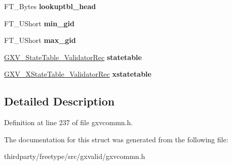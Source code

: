 \begin{DoxyCompactItemize}
\mbox{\label{struct_g_x_v___validator_rec___a6c6e818fa3ad9f2e4bad5c5f7ebfc156}} 
F\+T\+\_\+\+Bytes {\bfseries lookuptbl\+\_\+head}
\item 
\mbox{\label{struct_g_x_v___validator_rec___a9ceebe8532a8e4fc16194a38cb6a0fc1}} 
F\+T\+\_\+\+U\+Short {\bfseries min\+\_\+gid}
\item 
\mbox{\label{struct_g_x_v___validator_rec___a4b20f88d0ab67f441fc44a5472d73d05}} 
F\+T\+\_\+\+U\+Short {\bfseries max\+\_\+gid}
\item 
\mbox{\label{struct_g_x_v___validator_rec___a10719f46b658d00f0adfd77aa70b1d37}} 
\hyperlink{struct_g_x_v___state_table___validator_rec__}{G\+X\+V\+\_\+\+State\+Table\+\_\+\+Validator\+Rec} {\bfseries statetable}
\item 
\mbox{\label{struct_g_x_v___validator_rec___a175caf5071de1e4ec0b3da1f9ad909e9}} 
\hyperlink{struct_g_x_v___x_state_table___validator_rec__}{G\+X\+V\+\_\+\+X\+State\+Table\+\_\+\+Validator\+Rec} {\bfseries xstatetable}
\end{DoxyCompactItemize}


\subsection{Detailed Description}


Definition at line 237 of file gxvcommn.\+h.



The documentation for this struct was generated from the following file\+:\begin{DoxyCompactItemize}
\item 
thirdparty/freetype/src/gxvalid/gxvcommn.\+h\end{DoxyCompactItemize}
